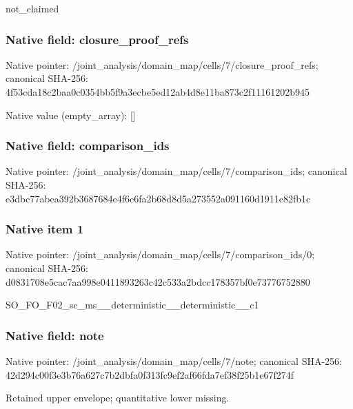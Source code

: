 \documentclass[10pt,a4paper]{article}
\begin{document}
\begingroup\raggedright\sloppy not\_\allowbreak{}claimed\par\endgroup

\subsubsection{Native field: closure\_\allowbreak{}proof\_\allowbreak{}refs}
Native pointer: /joint\_\allowbreak{}analysis/domain\_\allowbreak{}map/cells/7/closure\_\allowbreak{}proof\_\allowbreak{}refs; canonical SHA-256: 4f53cda18c2baa0c0354bb5f9a3ecbe5ed12ab4d8e11ba873c2f11161202b945

Native value (empty\_\allowbreak{}array): []

\subsubsection{Native field: comparison\_\allowbreak{}ids}
Native pointer: /joint\_\allowbreak{}analysis/domain\_\allowbreak{}map/cells/7/comparison\_\allowbreak{}ids; canonical SHA-256: e3dbc77abea392b3687684e4f6c6fa2b68d8d5a273552a091160d1911c82fb1c

\subsubsection{Native item 1}
Native pointer: /joint\_\allowbreak{}analysis/domain\_\allowbreak{}map/cells/7/comparison\_\allowbreak{}ids/0; canonical SHA-256: d0831708e5cac7aa998e0411893263c42c533a2bdcc178357bf0e73776752880

\begingroup\raggedright\sloppy SO\_\allowbreak{}FO\_\allowbreak{}F02\_\allowbreak{}sc\_\allowbreak{}ms\_\allowbreak{}\_\allowbreak{}deterministic\_\allowbreak{}\_\allowbreak{}deterministic\_\allowbreak{}\_\allowbreak{}c1\par\endgroup

\subsubsection{Native field: note}
Native pointer: /joint\_\allowbreak{}analysis/domain\_\allowbreak{}map/cells/7/note; canonical SHA-256: 42d294c00f3e3b76a627c7b2dbfa0f313fc9ef2af66fda7ef38f25b1e67f274f

\begingroup\raggedright\sloppy Retained upper envelope;\allowbreak{} quantitative lower missing.\par\endgroup
\end{document}
